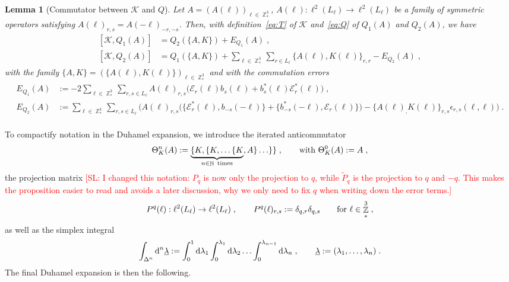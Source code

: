 \documentclass[12pt,a4paper]{article}
\numberwithin{equation}{section}
\newcommand{\cK}{\mathcal{K}}
\newcommand{\ulambda}{\underline{\lambda}}
\newcommand{\1}{\mathbb{I}}
\newcommand{\di}{\textnormal{d}}
\DeclareMathOperator{\N}{\mathbb{N}}
\DeclareMathOperator{\Z}{\mathbb{Z}}
\theoremstyle{plain}
\newtheorem{lemma}[theorem]{Lemma}
\theoremstyle{definition}
\theoremstyle{remark}
\theoremstyle{plain}
\theoremstyle{definition}
\theoremstyle{remark}
\begin{document}
\begin{lemma}[Commutator between $\cK $ and $Q$]\label{lem:Q1Kcomm}
Let $ A = (A(\ell))_{\ell \in \Z^3_*} $, $ A(\ell) : \ell^2(L_\ell) \to \ell^2(L_\ell) $ be a family of symmetric operators satisfying $A(\ell)_{r,s} = A(-\ell)_{-r,-s}$. Then, with definition~\eqref{eq:T} of $ \cK $ and~\eqref{eq:Q} of $ Q_1(A) $ and $ Q_2(A) $, we have
\begin{equation}
\begin{aligned}
	[\cK, Q_1(A)] 
	&= Q_2(\{A,K\})
		+ E_{Q_1}(A) \;, \\
	[\cK, Q_2(A)] 
	&= Q_1\left(\{A,K\} \right) 
		+ \sum\limits_{\ell \in \Z^3_*} \sum\limits_{r \in L_{\ell}} \big\{ A(\ell), K(\ell) \big\}_{r,r}
		- E_{Q_2}(A) \;,
\end{aligned}
\end{equation}
with the family $ \{A,K\} = (\{A(\ell),K(\ell)\})_{\ell \in \Z^3_*} $ and with the commutation errors
\begin{equation}\label{eq:errKQ}
\begin{aligned}
	E_{Q_1}(A)
	&:= - 2 \sum\limits_{\ell \in \Z^3_*}\sum\limits_{r,s \in L_{\ell}}A(\ell)_{r,s}\Big(\mathcal{E}_{r}(\ell)b_{s}(\ell) + b^*_{s}(\ell)\mathcal{E}^*_{r}(\ell)\Big) \;, \\
	E_{Q_2}(A)
	& := \sum\limits_{\ell \in \Z^3_*}\sum\limits_{r,s \in L_{\ell}}\Big(A(\ell)_{r,s}\big(\big\{\mathcal{E}^*_{r}(\ell), b_{-s}(-\ell)\big\} + \big\{ b^*_{-s}(-\ell) , \mathcal{E}_r(\ell) \big\} \big)-\big\{A(\ell)_,K(\ell)\big\}_{r,s}\epsilon_{r,s}(\ell,\ell)\Big) \;. \\
\end{aligned} 
\end{equation}
\end{lemma}


To compactify notation in the Duhamel expansion, we introduce the iterated anticommutator
\begin{equation} \label{eq:Theta}
	\Theta_K^n (A)
	:= \underbrace{\{ K, \{ K , \ldots \{K}_{n \in \N \textnormal{ times}} , A\} \ldots \} \} \;, \qquad
	\textnormal{with }
	\Theta_K^0 (A)
	:= A \;,
\end{equation}
the projection matrix \textcolor{red}{[SL: I changed this notation: $ P_q $ is now only the projection to $ q $, while $ \tilde{P}_q $ is the projection to $ q $ and $ -q $. This makes the proposition easier to read and avoids a later discussion, why we only need to fix $ q $ when writing down the error terms.]}
\begin{equation} \label{eq:Pq}
	P^q(\ell) : \ell^2(L_\ell) \to \ell^2(L_\ell) \;, \qquad
	P^q(\ell)_{r,s} := \delta_{q,r} \delta_{q,s} \qquad
	\textnormal{for } \ell \in \Z^3_* \;,
\end{equation}
as well as the simplex integral
\begin{equation} \label{eq:Deltan}
	\int_{\Delta^n} \di^n \ulambda
	:= \int_0^1 \di \lambda_1 \int_0^{\lambda_1} \di \lambda_2 \ldots \int_0^{\lambda_{n-1}} \di \lambda_n \;, \qquad
	\ulambda := (\lambda_1, \ldots, \lambda_n) \;.
\end{equation}
The final Duhamel expansion is then the following.
\end{document}

